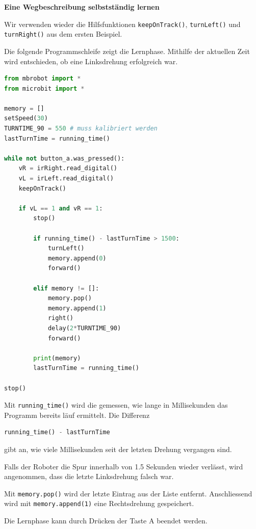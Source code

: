 \begin{myexample}
    \textbf{Eine Wegbeschreibung selbstständig lernen}

    Wir verwenden wieder die Hilfsfunktionen
    \texttt{keepOnTrack()}, \texttt{turnLeft()} und
    \texttt{turnRight()} aus dem ersten Beispiel.

    Die folgende Programmschleife zeigt die Lernphase.
    Mithilfe der aktuellen Zeit wird entschieden,
    ob eine Linksdrehung erfolgreich war.

    \begin{lstlisting}[language=Python]
from mbrobot import *
from microbit import *

memory = []
setSpeed(30)
TURNTIME_90 = 550 # muss kalibriert werden
lastTurnTime = running_time()

while not button_a.was_pressed():
    vR = irRight.read_digital()
    vL = irLeft.read_digital()
    keepOnTrack()

    if vL == 1 and vR == 1:
        stop()

        if running_time() - lastTurnTime > 1500:
            turnLeft()
            memory.append(0)
            forward()

        elif memory != []:
            memory.pop()
            memory.append(1)
            right()
            delay(2*TURNTIME_90)
            forward()

        print(memory)
        lastTurnTime = running_time()

stop()
    \end{lstlisting}

    Mit \texttt{running\_time()} wird die gemessen, wie lange
    in Millisekunden das Programm bereits läuf ermittelt. Die Differenz

    \begin{lstlisting}[language=Python]
running_time() - lastTurnTime
    \end{lstlisting}

    gibt an, wie viele Millisekunden seit der letzten
    Drehung vergangen sind.

    Falls der Roboter die Spur innerhalb von 1.5
    Sekunden wieder verlässt, wird angenommen,
    dass die letzte Linksdrehung falsch war.

    Mit \texttt{memory.pop()} wird der letzte Eintrag
    aus der Liste entfernt. Anschliessend wird mit
    \texttt{memory.append(1)} eine Rechtsdrehung
    gespeichert.

    Die Lernphase kann durch Drücken der Taste A
    beendet werden.
\end{myexample}

